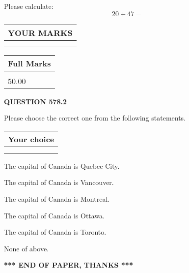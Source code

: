 \documentclass[12pt]{article}
\begin{document}
  
 
Please calculate:
\begin{equation}
20 +  %
47 = \nonumber
\end{equation}
 

 

 
  
\vspace{0.2in}
  
\noindent\begin{tabular}{|l|}
\hline
 YOUR MARKS  \\
\hline
 \\ 
 \\ 
\hline
\end{tabular}
\hspace{0.05in} \begin{tabular}{|l|}
\hline
 Full Marks  \\
\hline
 \\ 
50.00 \\
\hline
\end{tabular}
{\textbf{\Large{QUESTION
578.2 
}}}
  
  
Please choose the correct one from the following statements.
  
  
\noindent\hspace{3.0in} \begin{tabular}{|l|}
\hline
Your choice \\
\hline
 \\ 
 \\ 
\hline
\end{tabular}
  
  
 
 
The capital of Canada is Quebec City.
 
 
The capital of Canada is Vancouver.
 
 
The capital of Canada is Montreal.
 
 
The capital of Canada is Ottawa.
 
 
The capital of Canada is Toronto.
 
 
 None of above.
 
 
   
   
 \vspace{0.2in}
 
   
   
   
   
\vspace{1.0in} 
{\textbf{\large{ *** END OF PAPER, THANKS *** }}} 
   
\end{document}
